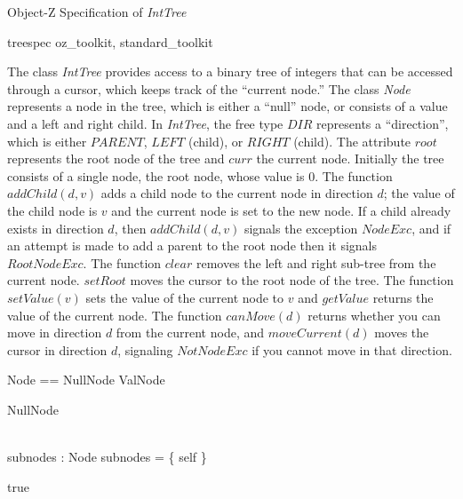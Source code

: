 \documentclass{article}
\begin{document}
\begin{center}
\begin{large}
Object-Z Specification of {\em IntTree}
\end{large}
\end{center}

\begin{zsection}
  \SECTION treespec \parents oz\_toolkit, standard\_toolkit
\end{zsection}

\noindent
The class {\em IntTree} provides access to a binary tree of integers that
can be accessed through a cursor, which keeps track of the ``current node.''
The class {\em Node} represents a node in the tree, which is either a
``null'' node, or consists of a value and a left and right child.
In {\em IntTree}, the free type $DIR$ represents a ``direction'', which
is either $PARENT$, $LEFT$ (child), or $RIGHT$ (child).
The attribute $root$ represents the root node of the tree
and $curr$ the current node.
Initially the tree consists of a single node, the root node, whose value
is 0.
The function $addChild(d,v)$ adds a child node to the current node in
direction $d$; the value of the child node is $v$ and the current node
is set to the new node.
If a child already exists in direction $d$, then $addChild(d,v)$ signals
the exception $NodeExc$, and if an attempt is made to add a parent to the
root node then it signals $RootNodeExc$.
The function $clear$ removes the left and right sub-tree from the current node.
$setRoot$ moves the cursor to the root node of the tree.
The function $setValue(v)$ sets the value of the current node to $v$ and
$getValue$ returns the value of the current node.
The function $canMove(d)$ returns whether you can move in direction $d$
from the current node, and $moveCurrent(d)$ moves the cursor in direction
$d$, signaling $NotNodeExc$ if you cannot move in that direction.

\begin{zed}
Node == NullNode \classuni ValNode
\end{zed}

\begin{class}{NullNode}
\begin{state}
	\Delta \\
	subnodes : \finset Node
\where
	subnodes = \{ self \}
\end{state}
\begin{init}
  true
\end{init}\\
\end{class}
\end{document}
